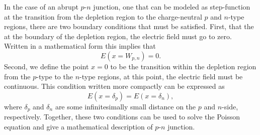 In the case of an abrupt $p$-$n$ junction, one that can be modeled as step-function at the transition
from the depletion region to the charge-neutral $p$ and $n$-type regions, there are two boundary conditions that must be 
satisfied. First, that the at the boundary of the depletion region, the electric field must go to zero. Written in 
a mathematical form this implies that 
\begin{equation}
    \label{eq:bc1}
    E(x=W_{p,n}) = 0.
\end{equation}
Second, we define the point $x = 0$ to be the transition within the depletion region from the $p$-type to the $n$-type regions, at this point, the 
electric field must be continuous. This condition written more compactly can be expressed as
\begin{equation}
    \label{eq:bc2}
    E(x = \delta_{p}) = E(x = \delta_{n}),
\end{equation}
where $\delta_p$ and $\delta_n$ are some infinitesimally small distance on the $p$ and $n$-side, respectively. Together,
these two conditions can be used to solve the Poisson equation and give a mathematical description of $p$-$n$ junction.

